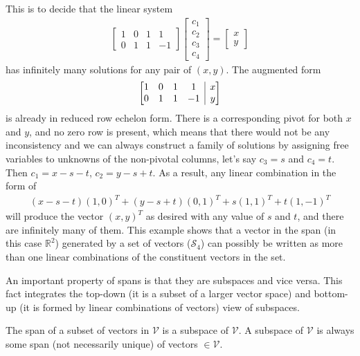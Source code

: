\begin{solution}
This is to decide that the linear system
\begin{align*}
\begin{bmatrix}
1 & 0 & 1 & 1 \\
0 & 1 & 1 & -1
\end{bmatrix}
\begin{bmatrix}
c_1 \\
c_2 \\
c_3 \\
c_4
\end{bmatrix}
=
\begin{bmatrix}
x \\
y
\end{bmatrix}    
\end{align*}
has infinitely many solutions for any pair of $(x,y)$. The augmented form
\begin{align*}
\left[\begin{array}{@{}cccc|c@{}}
1 & 0 & 1 & 1 & x \\
0 & 1 & 1 & -1 & y
\end{array}\right]
\end{align*}
is already in reduced row echelon form. There is a corresponding pivot for both $x$ and $y$, and no zero row is present, which means that there would not be any inconsistency and we can always construct a family of solutions by assigning free variables to unknowns of the non-pivotal columns, let's say $c_3 = s$ and $c_4 = t$. Then $c_1 = x - s - t$, $c_2 = y - s + t$. As a result, any linear combination in the form of
\begin{align*}
(x-s-t)(1,0)^T + (y - s + t)(0,1)^T + s(1,1)^T + t(1,-1)^T
\end{align*}
will produce the vector $(x,y)^T$ as desired with any value of $s$ and $t$, and there are infinitely many of them. This example shows that a vector in the span (in this case $\mathbb{R}^2$) generated by a set of vectors ($\mathcal{S}_4$) can possibly be written as more than one linear combinations of the constituent vectors in the set.
\end{solution}
An important property of spans is that they are subspaces and vice versa. This fact integrates the top-down (it is a subset of a larger vector space) and bottom-up (it is formed by linear combinations of vectors) view of subspaces.
\begin{proper}
\label{proper:subspace_n_span}
The span of a subset of vectors in $\mathcal{V}$ is a subspace of $\mathcal{V}$. A subspace of $\mathcal{V}$ is always some span (not necessarily unique) of vectors $\in \mathcal{V}$.
\end{proper}

